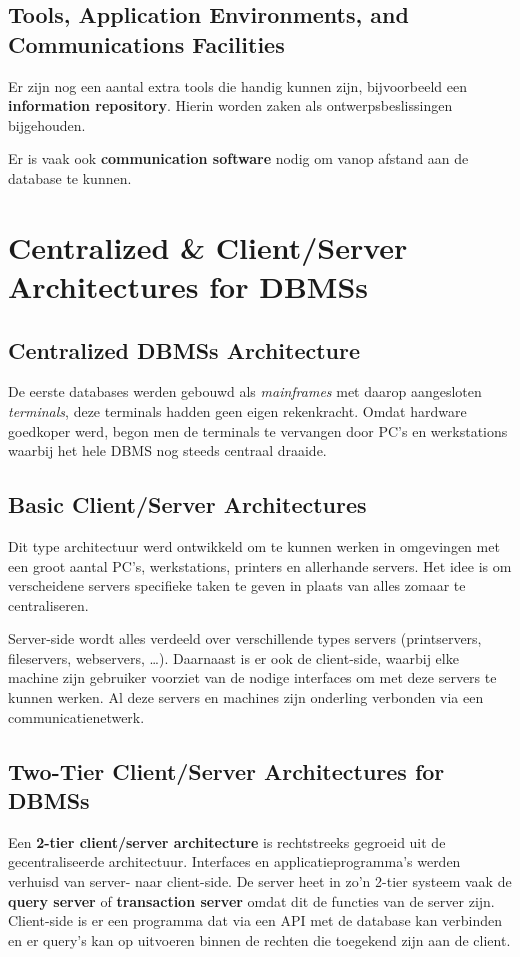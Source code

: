 \subsection{Tools, Application Environments, and Communications Facilities}
Er zijn nog een aantal extra tools die handig kunnen zijn, bijvoorbeeld een \textbf{information repository}. Hierin worden zaken als ontwerpsbeslissingen bijgehouden.

Er is vaak ook \textbf{communication software} nodig om vanop afstand aan de database te kunnen.


\section{Centralized \& Client/Server Architectures for DBMSs}
\subsection{Centralized DBMSs Architecture}
De eerste databases werden gebouwd als \textit{mainframes} met daarop aangesloten \textit{terminals}, deze terminals hadden geen eigen rekenkracht. Omdat hardware goedkoper werd, begon men de terminals te vervangen door PC's en werkstations waarbij het hele DBMS nog steeds centraal draaide.

\subsection{Basic Client/Server Architectures}
Dit type architectuur werd ontwikkeld om te kunnen werken in omgevingen met een groot aantal PC's, werkstations, printers en allerhande servers. Het idee is om verscheidene servers specifieke taken te geven in plaats van alles zomaar te centraliseren.

Server-side wordt alles verdeeld over verschillende types servers (printservers, fileservers, webservers, \dots). Daarnaast is er ook de client-side, waarbij elke machine zijn gebruiker voorziet van de nodige interfaces om met deze servers te kunnen werken. 
Al deze servers en machines zijn onderling verbonden via een communicatienetwerk.

\subsection{Two-Tier Client/Server Architectures for DBMSs}
Een \textbf{2-tier client/server architecture} is rechtstreeks gegroeid uit de gecentraliseerde architectuur. Interfaces en applicatieprogramma's werden verhuisd van server- naar client-side. De server heet in zo'n 2-tier systeem vaak de \textbf{query server} of \textbf{transaction server} omdat dit de functies van de server zijn. Client-side is er een programma dat via een API met de database kan verbinden en er query's kan op uitvoeren binnen de rechten die toegekend zijn aan de client.

